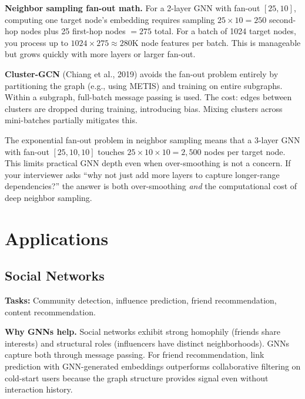 \textbf{Neighbor sampling fan-out math.} For a 2-layer GNN with fan-out $[25, 10]$, computing one target node's embedding requires sampling $25 \times 10 = 250$ second-hop nodes plus 25 first-hop nodes $= 275$ total. For a batch of 1024 target nodes, you process up to $1024 \times 275 \approx 280$K node features per batch. This is manageable but grows quickly with more layers or larger fan-out.

\textbf{Cluster-GCN} (Chiang et al., 2019) avoids the fan-out problem entirely by partitioning the graph (e.g., using METIS) and training on entire subgraphs. Within a subgraph, full-batch message passing is used. The cost: edges between clusters are dropped during training, introducing bias. Mixing clusters across mini-batches partially mitigates this.

\begin{warningbox}
The exponential fan-out problem in neighbor sampling means that a 3-layer GNN with fan-out $[25, 10, 10]$ touches $25 \times 10 \times 10 = 2{,}500$ nodes per target node. This limits practical GNN depth even when over-smoothing is not a concern. If your interviewer asks ``why not just add more layers to capture longer-range dependencies?'' the answer is both over-smoothing \textit{and} the computational cost of deep neighbor sampling.
\end{warningbox}

\section{Applications}
\label{sec:gnn_applications}

\subsection{Social Networks}

\textbf{Tasks:} Community detection, influence prediction, friend recommendation, content recommendation.

\textbf{Why GNNs help.} Social networks exhibit strong homophily (friends share interests) and structural roles (influencers have distinct neighborhoods). GNNs capture both through message passing. For friend recommendation, link prediction with GNN-generated embeddings outperforms collaborative filtering on cold-start users because the graph structure provides signal even without interaction history.

